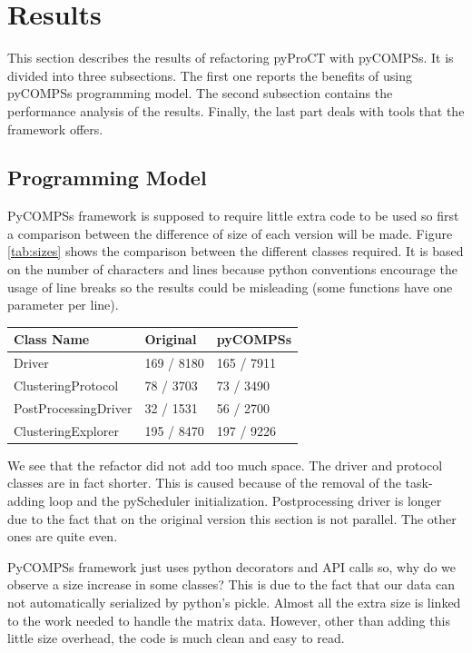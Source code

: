 \chapter{Results}


This section describes the results of refactoring pyProCT with pyCOMPSs. It is divided into three subsections. The first one reports the benefits of using pyCOMPSs programming model. The second subsection contains the performance analysis of the results. Finally, the last part deals with tools that the framework offers.

\section{Programming Model}

PyCOMPSs framework is supposed to require little extra code to be used so first a comparison between the difference of size of each version will be made. Figure \ref{tab:sizes} shows the comparison between the different classes required. It is based on the number of characters and lines because python conventions encourage the usage of line breaks so the results could be misleading (some functions have one parameter per line).


\begin{center}
	\begin{tabular}{| R{6cm} | L{3cm} | L{3cm} |}
		\hline
		Class Name & Original & pyCOMPSs \\ 
		\hline
		\hline
		Driver & 169 / 8180  &  165 / 7911 \\
		\hline
		ClusteringProtocol & 78 / 3703 & 73 / 3490 \\
		\hline
		PostProcessingDriver & 32 / 1531 & 56 / 2700 \\
		\hline
		ClusteringExplorer & 195 / 8470 & 197 / 9226 \\ 
		\hline
	\end{tabular}
	\label{tab:sizes}
\end{center}


We see that the refactor did not add too much space. The driver and protocol classes are in fact shorter. This is caused because of the removal of the task-adding loop and the pyScheduler initialization. Postprocessing driver is longer due to the fact that on the original version this section is not parallel. The other ones are quite even.

PyCOMPSs framework just uses python decorators and API calls so, why do we observe a size increase in some classes? This is due to the fact that our data can not automatically serialized by python's pickle. Almost all the extra size is linked to the work needed to handle the matrix data. However, other than adding this little size overhead, the code is much clean and easy to read. 

